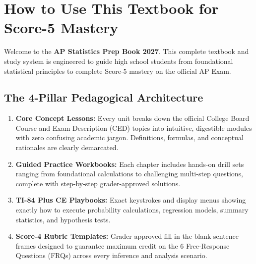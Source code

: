 \tableofcontents
\clearpage

\chapter*{How to Use This Textbook for Score-5 Mastery}

Welcome to the \textbf{AP Statistics Prep Book 2027}. This complete textbook and study system is engineered to guide high school students from foundational statistical principles to complete Score-5 mastery on the official AP Exam.

\section*{The 4-Pillar Pedagogical Architecture}
\begin{enumerate}[leftmargin=1.5em]
  \item \textbf{Core Concept Lessons:} Every unit breaks down the official College Board Course and Exam Description (CED) topics into intuitive, digestible modules with zero confusing academic jargon. Definitions, formulas, and conceptual rationales are clearly demarcated.
  \item \textbf{Guided Practice Workbooks:} Each chapter includes hands-on drill sets ranging from foundational calculations to challenging multi-step questions, complete with step-by-step grader-approved solutions.
  \item \textbf{TI-84 Plus CE Playbooks:} Exact keystrokes and display menus showing exactly how to execute probability calculations, regression models, summary statistics, and hypothesis tests.
  \item \textbf{Score-4 Rubric Templates:} Grader-approved fill-in-the-blank sentence frames designed to guarantee maximum credit on the 6 Free-Response Questions (FRQs) across every inference and analysis scenario.
\end{enumerate}

